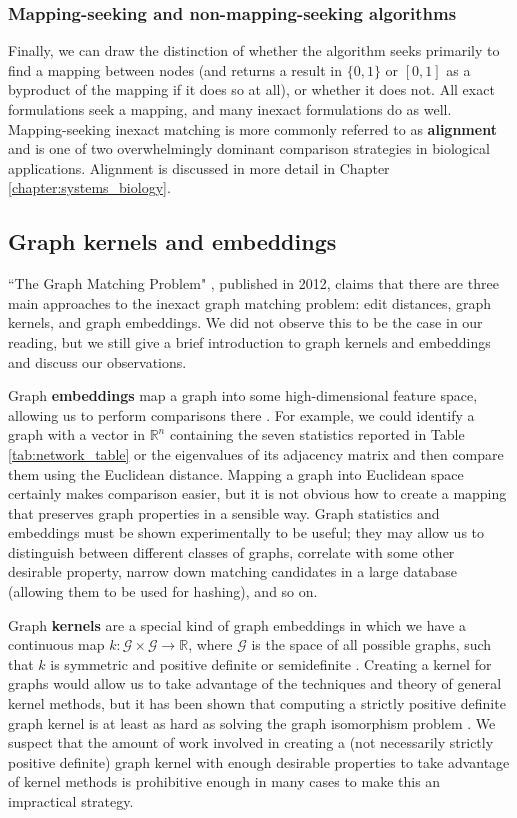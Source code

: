 \documentclass[12pt]{thesis}
\theoremstyle{plain}
\theoremstyle{definition}
\theoremstyle{remark}
\newcommand{\R}{\mathbb{R}}
\begin{document}
\subsubsection{Mapping-seeking and non-mapping-seeking algorithms} 

Finally, we can draw the distinction of whether the algorithm seeks primarily to find a mapping between nodes (and returns a result in $\{0,1\}$ or $[0,1]$ as a byproduct of the mapping if it does so at all), or whether it does not. All exact formulations seek a mapping, and many inexact formulations do as well. Mapping-seeking inexact matching is more commonly referred to as \textbf{alignment} and is one of two overwhelmingly dominant comparison strategies in biological applications. Alignment is discussed in more detail in Chapter \ref{chapter:systems_biology}.

\subsection{Graph kernels and embeddings}

``The Graph Matching Problem" \cite{Livi_2012}, published in 2012, claims that there are three main approaches to the inexact graph matching problem: edit distances, graph kernels, and graph embeddings. We did not observe this to be the case in our reading, but we still give a brief introduction to graph kernels and embeddings and discuss our observations.

Graph \textbf{embeddings} map a graph into some high-dimensional feature space, allowing us to perform comparisons there \cite{Emmert_Streib_2011}. For example, we could identify a graph with a vector in $\R^n$ containing the seven statistics reported in Table \ref{tab:network_table} or the eigenvalues of its adjacency matrix and then compare them using the Euclidean distance. Mapping a graph into Euclidean space certainly makes comparison easier, but it is not obvious how to create a mapping that preserves graph properties in a sensible way. Graph statistics and embeddings must be shown experimentally to be useful; they may allow us to distinguish between different classes of graphs, correlate with some other desirable property, narrow down matching candidates in a large database (allowing them to be used for hashing), and so on.
\newpage

Graph \textbf{kernels} are a special kind of graph embeddings in which we have a continuous map $k:\mathcal{G}\times \mathcal{G}\rightarrow \R$, where $\mathcal{G}$ is the space of all possible graphs, such that $k$ is symmetric and positive definite or semidefinite \cite{Livi_2012}. Creating a kernel for graphs would allow us to take advantage of the techniques and theory of general kernel methods, but it has been shown that computing a strictly positive definite graph kernel is at least as hard as solving the graph isomorphism problem \cite{Gartner_2003}. We suspect that the amount of work involved in creating a (not necessarily strictly positive definite) graph kernel with enough desirable properties to take advantage of kernel methods is prohibitive enough in many cases to make this an impractical strategy.
\end{document}
